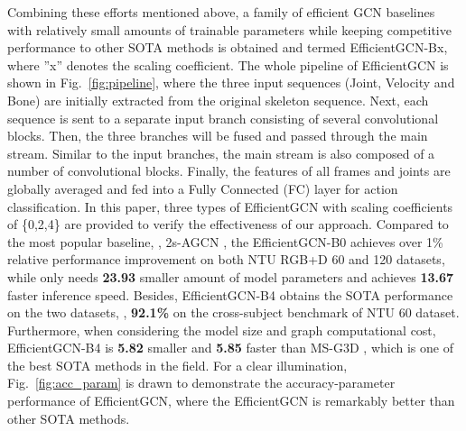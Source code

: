\documentclass[10pt,journal,compsoc]{IEEEtran}
\begin{document}
Combining these efforts mentioned above, a family of efficient GCN baselines with relatively small amounts of trainable parameters while keeping competitive performance to other SOTA methods is obtained and termed EfficientGCN-Bx, where ''x'' denotes the scaling coefficient. The whole pipeline of EfficientGCN is shown in Fig.~\ref{fig:pipeline}, where the three input sequences (Joint, Velocity and Bone) are initially extracted from the original skeleton sequence. Next, each sequence is sent to a separate input branch consisting of several convolutional blocks. Then, the three branches will be fused and passed through the main stream. Similar to the input branches, the main stream is also composed of a number of convolutional blocks. Finally, the features of all frames and joints are globally averaged and fed into a Fully Connected (FC) layer for action classification. In this paper, three types of EfficientGCN with scaling coefficients of \{0,2,4\} are provided to verify the effectiveness of our approach. Compared to the most popular baseline, \ie, 2s-AGCN \cite{shi2019two}, the EfficientGCN-B0 achieves over 1\% relative performance improvement on both NTU RGB+D 60 \cite{shahroudy2016ntu} and 120 \cite{liu2019ntu} datasets, while only needs {\bf 23.93} smaller amount of model parameters and achieves {\bf 13.67} faster inference speed. Besides, EfficientGCN-B4 obtains the SOTA performance on the two datasets, \eg, {\bf 92.1\%} on the cross-subject benchmark of NTU 60 dataset. Furthermore, when considering the model size and graph computational cost, EfficientGCN-B4 is {\bf 5.82} smaller and {\bf 5.85} faster than MS-G3D \cite{liu2020disentangling}, which is one of the best SOTA methods in the field. For a clear illumination, Fig.~\ref{fig:acc_param} is drawn to demonstrate the accuracy-parameter performance of EfficientGCN, where the EfficientGCN is remarkably better than other SOTA methods.
\end{document}
